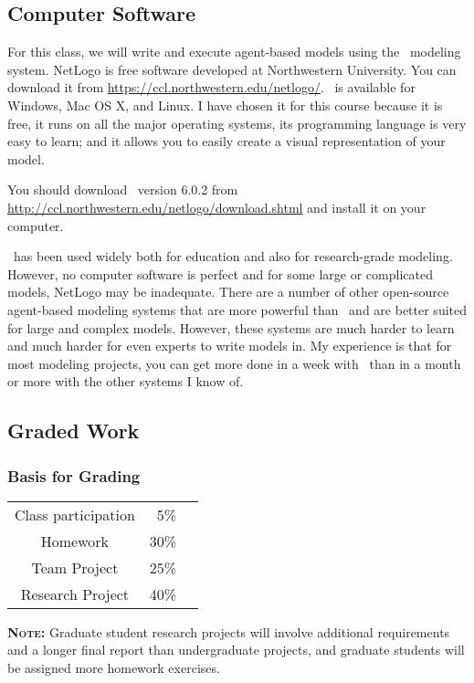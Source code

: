 \documentclass[11pt,twoside]{jgsyllabus}\usepackage[]{graphicx}\usepackage[]{color}
\begin{document}
\subsection{Computer Software}
For this class, we will write and execute agent-based models using the \NetLogo\
modeling system. NetLogo is free software developed at Northwestern University.
You can download it from \url{https://ccl.northwestern.edu/netlogo/}.
\NetLogo\ is available for Windows, Mac OS X, and Linux.
I have chosen it for this course because it is free, it runs on all the major
operating systems, its programming language is very easy to learn; and it allows
you to easily create a visual representation of your model.

You should download \NetLogo\ version 6.0.2 from
\url{http://ccl.northwestern.edu/netlogo/download.shtml}
and install it on your computer.

\NetLogo\ has been used widely both for education and also for research-grade
modeling. However, no computer software is perfect and for some large or
complicated models, NetLogo may be inadequate.
There are a number of other
open-source agent-based modeling systems that are more powerful than \NetLogo\
and are better suited for large and complex models. However, these systems are
much harder to learn and much harder for even experts to write models in.
My experience is that for most modeling projects, you can get more done in a
week with \NetLogo\ than in a month or more with the other systems I know of.

\subsection{Graded Work}
%
%
%
\subsubsection[Grading]{Basis for Grading}
\begin{center}
	\begin{tabular}[t]{crr}
		Class participation & 5\% &\\
		Homework & 30\% &\\
		Team Project & 25\% &\\
		Research Project & 40\% &
	\end{tabular}
\end{center}

\textbf{\scshape Note:} Graduate student research projects will involve
additional requirements and a longer final report than undergraduate projects,
and graduate students will be assigned more homework exercises.
\end{document}
